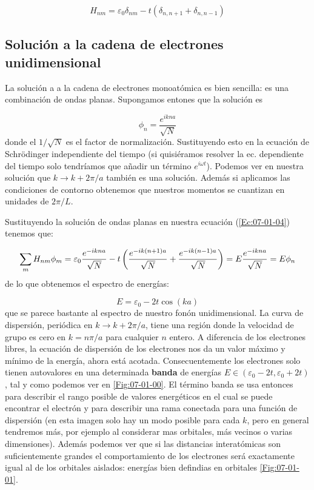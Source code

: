 \begin{equation}
	H_{nm} = \varepsilon_0 \delta_{nm} - t(\delta_{n,n+1}+\delta_{n,n-1})
\end{equation}

\subsection{Solución a la cadena de electrones unidimensional}

La solución a a la cadena de electrones monoatómica es bien sencilla: es una combinación de ondas planas. Supongamos entones que la solución es

\begin{equation}
	\phi_n = \frac{e^{ikna}}{\sqrt{N}}
\end{equation}
donde el $1/\sqrt{N}$ es el factor de normalización. Sustituyendo esto en la ecuación de Schrödinger independiente del tiempo (si quisiéramos resolver la ec. dependiente del tiempo solo tendríamos que añadir un término $e^{i\omega t}$). Podemos ver en nuestra solución que $k\rightarrow k + 2 \pi /a$ también es una solución. Además si aplicamos las condiciones de contorno obtenemos que nuestros momentos se cuantizan en unidades de $2\pi /L$. 

Sustituyendo la solución de ondas planas en nuestra ecuación (\ref{Ec:07-01-04}) tenemos que:

\begin{equation}
	\sum_m H_{nm} \phi_m = \varepsilon_0 \frac{e^{-ikna}}{\sqrt{N}} - t \left( \frac{e^{-ik(n+1)a}}{\sqrt{N}}+\frac{e^{-ik(n-1)a}}{\sqrt{N}} \right) = E \frac{e^{-ikna}}{\sqrt{N}} = E\phi_n
\end{equation}
de lo que obtenemos el espectro de energías:

\begin{equation}
	E=\varepsilon_0 - 2 t \cos (ka)
\end{equation}
que se parece bastante al espectro de nuestro fonón unidimensional. La curva de dispersión, periódica en $k\rightarrow k+2\pi/a$, tiene una región donde la velocidad de grupo es cero en $k=n\pi/a$ para cualquier $n$ entero. A diferencia de los electrones libres, la ecuación de dispersión de los electrones nos da un valor máximo y mínimo de la energía, ahora está acotada. Consecuentemente los electrones solo tienen autovalores en una determinada \textbf{banda} de energías $E\in (\varepsilon_0-2t,\varepsilon_0+2t)$, tal y como podemos ver en \ref{Fig:07-01-00}. El término banda se usa entonces para describir el rango posible de valores energéticos en el cual se puede encontrar el electrón y para describir una rama conectada para una función de dispersión (en esta imagen solo hay un modo posible para cada $k$, pero en general tendremos más, por ejemplo al considerar mas orbitales, más vecinos o varias dimensiones). Además podemos ver que si las distancias interatómicas son suficientemente grandes el comportamiento de los electrones será exactamente igual al de los orbitales aislados: energías bien defindias en orbitales \ref{Fig:07-01-01}.


